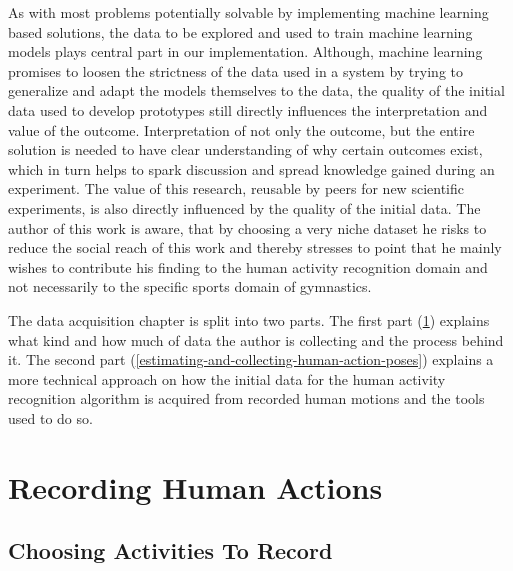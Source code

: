 As with most problems potentially solvable by implementing machine learning based solutions, the data to be explored and used to train machine learning models plays central part in our implementation. Although, machine learning promises to loosen the strictness of the data used in a system by trying to generalize and adapt the models themselves to the data, the quality of the initial data used to develop prototypes still directly influences the interpretation and value of the outcome. Interpretation of not only the outcome, but the entire solution is needed to have clear understanding of why certain outcomes exist, which in turn helps to spark discussion and spread knowledge gained during an experiment. The value of this research, reusable by peers for new scientific experiments, is also directly influenced by the quality of the initial data. The author of this work is aware, that by choosing a very niche dataset he risks to reduce the social reach of this work and thereby stresses to point that he mainly wishes to contribute his finding to the human activity recognition domain and not necessarily to the specific sports domain of gymnastics.

The data acquisition chapter is split into two parts. The first part (\ref{recording-human-actions}) explains what kind and how much of data the author is collecting and the process behind it. The second part (\ref{estimating-and-collecting-human-action-poses}) explains a more technical approach on how the initial data for the human activity recognition algorithm is acquired from recorded human motions and the tools used to do so.

\section{Recording Human Actions}
\label{recording-human-actions}

\subsection{Choosing Activities To Record}

